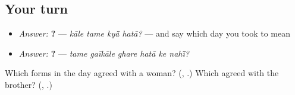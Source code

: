 \subsection*{Your turn}
\begin{itemize}
\raggedright
  \item \emph{Answer:} \textbf{   ?} — \emph{kāle tame kyā̃ hatā?} — and say which day you took \textbf{} to mean
  \item \emph{Answer:} \textbf{     ?} — \emph{tame gaīkāle ghare hatā ke nahī̃?}
\end{itemize}

\begin{tcolorbox}[breakable,colback=teal!4,colframe=teal!35!black,title={Before you move on}]
Which forms in the day agreed with a woman? (\textbf{}, \textbf{}.) Which agreed with the brother? (\textbf{}, \textbf{}.)
\end{tcolorbox}
